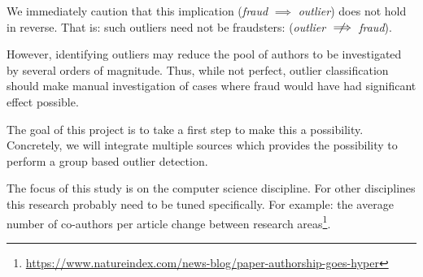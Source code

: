 \documentclass{ou-report}
\begin{document}
We immediately caution that this implication (\emph{fraud} $\implies$ \emph{outlier})
does  not hold in reverse. That is: such outliers need not be fraudsters: 
(\emph{outlier} $\centernot\implies$ \emph{fraud}). 

However, identifying outliers may reduce the pool of authors to be investigated
by se\-veral orders of magnitude. Thus, while not perfect, outlier classification
should make manual investigation of cases where fraud would have had significant
effect possible.

The goal of this project is to take a first step to make this a possibility.
Concretely, we will integrate multiple sources which provides the possibility
to perform a group based outlier detection.



The focus of this study is on the computer science 
discipline. For other disciplines this research probably need to be tuned specifically. 
For example: the average number of co-authors per article change between research 
areas\footnote{\url{https://www.natureindex.com/news-blog/paper-authorship-goes-hyper}}.
\end{document}
